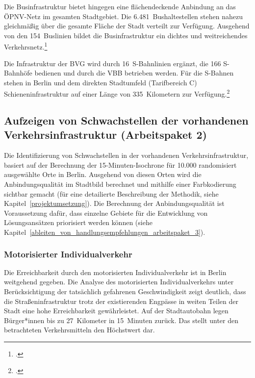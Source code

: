 Die Businfrastruktur bietet hingegen eine flächendeckende Anbindung an das ÖPNV-Netz im gesamten Stadtgebiet. Die 6.481~Bushaltestellen stehen nahezu gleichmäßig über die gesamte Fläche der Stadt verteilt zur Verfügung. Ausgehend von den 154~Buslinien bildet die Businfrastruktur ein dichtes und weitreichendes Verkehrsnetz.\footcite{BVG_daten}

Die Infrastruktur der BVG wird durch 16~S-Bahnlinien ergänzt, die 166 S-Bahnhöfe bedienen und durch die VBB betrieben werden. Für die S-Bahnen stehen in Berlin und dem direkten Stadtumfeld (Tarifbereich C) Schieneninfrastruktur auf einer Länge von 335~Kilometern zur Verfügung.\footcite{BVG_daten}

\subsection{Aufzeigen von Schwachstellen der vorhandenen Verkehrsinfrastruktur (Arbeitspaket 2)}

\label{aufzeigen_von_schwachstellen_der_vorhandenen_infrastruktur_arbeitspaket_2}

Die Identifizierung von Schwachstellen in der vorhandenen Verkehrsinfrastruktur, basiert auf der Berechnung der 15-Minuten-Isochrone für 10.000 randomisiert ausgewählte Orte in Berlin. Ausgehend von diesen Orten wird die Anbindungsqualität im Stadtbild berechnet und mithilfe einer Farbkodierung sichtbar gemacht (für eine detailierte Beschreibung der Methodik, siehe Kapitel~\ref{projektumsetzung}). Die Berechnung der Anbindungsqualität ist Voraussetzung dafür, dass einzelne Gebiete für die Entwicklung von Lösungsansätzen priorisiert werden können (siehe Kapitel~\ref{ableiten_von_handlungsempfehlungen_arbeitspaket_3}).

\subsubsection{Motorisierter Individualverkehr}

Die Erreichbarkeit durch den motorisierten Individualverkehr ist in Berlin weitgehend gegeben. Die Analyse des motorisierten Individualverkehrs unter Berücksichtigung der tatsächlich gefahrenen Geschwindigkeit zeigt deutlich, dass die Straßeninfrastruktur trotz der existierenden Engpässe in weiten Teilen der Stadt eine hohe Erreichbarkeit gewährleistet. Auf der Stadtautobahn legen Bürger*innen bis zu 27~Kilometer in 15~Minuten zurück. Das stellt unter den betrachteten Verkehrsmitteln den Höchstwert dar.

